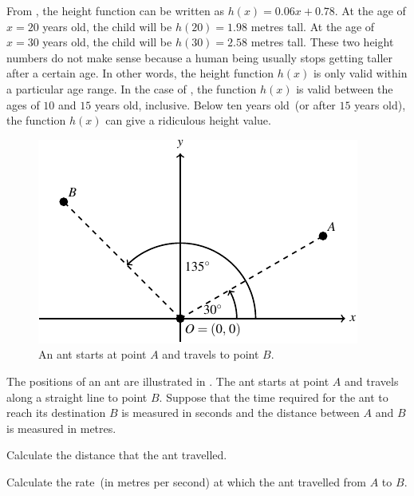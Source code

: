 \documentclass[a4paper,oneside,12pt]{article}
\begin{document}
\begin{problem}
{\begin{solution}
From ,
the height function can be written as $h(x) = 0.06x + 0.78$.  At the
age of $x = 20$ years old, the child will be $h(20) = 1.98$ metres
tall.  At the age of $x = 30$ years old, the child will be
$h(30) = 2.58$ metres tall.  These two height numbers do not make
sense because a human being usually stops getting taller after a
certain age.  In other words, the height function $h(x)$ is only valid
within a particular age range.  In the case of
, the function $h(x)$ is valid
between the ages of $10$ and $15$ years old, inclusive.  Below ten
years old~(or after $15$ years old), the function $h(x)$ can give a
ridiculous height value.
\end{solution}
}{}

\begin{figure}[!htbp]
\centering
\includegraphics[scale=1.5]{image/06/points-unit-circle.pdf}
\caption{%
  An ant starts at point $A$ and travels to point $B$.
}
\label{fig:unit_circle_A_30_degrees_B_135_degrees}
\end{figure}

\item The positions of an ant are illustrated in
  .  The ant starts
  at point $A$ and travels along a straight line to point $B$.
  Suppose that the time required for the ant to reach its destination
  $B$ is measured in seconds and the distance between $A$ and $B$ is
  measured in metres.
  \begin{packedenum}
  \item\label{subprob:ant_distance_travelled}
    Calculate the distance that the ant travelled.

  \item\label{subprob:ant_rate_per_second}
    Calculate the rate~(in metres per second) at which the ant
    travelled from $A$ to $B$.


\end{packedenum}
\end{problem}
\end{document}
